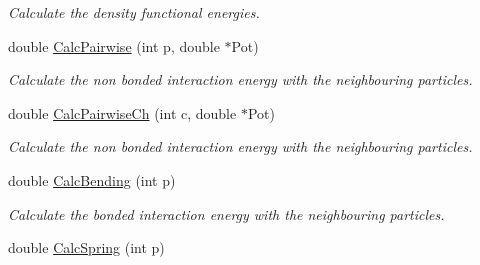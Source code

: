\begin{DoxyCompactItemize}
\begin{DoxyCompactList}\small\item\em Calculate the density functional energies. \end{DoxyCompactList}\item 
double \hyperlink{classForces_abcf9fe5fd43b953a9f9c836bb23f4b26}{Calc\+Pairwise} (int p, double $\ast$Pot)\hypertarget{classForces_abcf9fe5fd43b953a9f9c836bb23f4b26}{}\label{classForces_abcf9fe5fd43b953a9f9c836bb23f4b26}

\begin{DoxyCompactList}\small\item\em Calculate the non bonded interaction energy with the neighbouring particles. \end{DoxyCompactList}\item 
double \hyperlink{classForces_ad5fa9268736b6a2b17b8b600fea178be}{Calc\+Pairwise\+Ch} (int c, double $\ast$Pot)\hypertarget{classForces_ad5fa9268736b6a2b17b8b600fea178be}{}\label{classForces_ad5fa9268736b6a2b17b8b600fea178be}

\begin{DoxyCompactList}\small\item\em Calculate the non bonded interaction energy with the neighbouring particles. \end{DoxyCompactList}\item 
double \hyperlink{classForces_a85c318f4f79eb537a5d0be2552fae2af}{Calc\+Bending} (int p)\hypertarget{classForces_a85c318f4f79eb537a5d0be2552fae2af}{}\label{classForces_a85c318f4f79eb537a5d0be2552fae2af}

\begin{DoxyCompactList}\small\item\em Calculate the bonded interaction energy with the neighbouring particles. \end{DoxyCompactList}\item 
double \hyperlink{classForces_a9695c7258e7d8a3fb781280f258747cf}{Calc\+Spring} (int p)\hypertarget{classForces_a9695c7258e7d8a3fb781280f258747cf}{}\label{classForces_a9695c7258e7d8a3fb781280f258747cf}


\end{DoxyCompactItemize}
